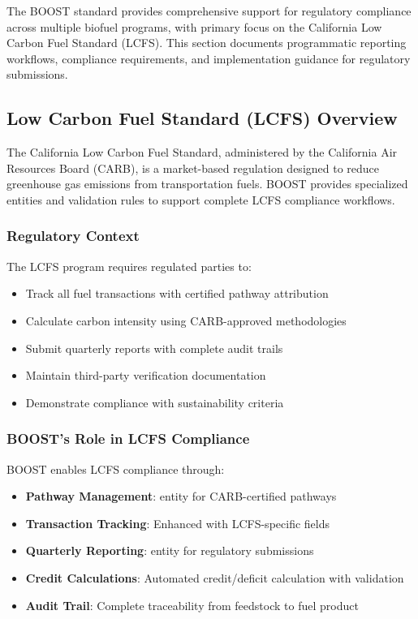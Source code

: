 

The BOOST standard provides comprehensive support for regulatory compliance across multiple biofuel programs, with primary focus on the California Low Carbon Fuel Standard (LCFS). This section documents programmatic reporting workflows, compliance requirements, and implementation guidance for regulatory submissions.

\subsection{Low Carbon Fuel Standard (LCFS) Overview}
\label{sec:lcfs-overview}

The California Low Carbon Fuel Standard, administered by the California Air Resources Board (CARB), is a market-based regulation designed to reduce greenhouse gas emissions from transportation fuels. BOOST provides specialized entities and validation rules to support complete LCFS compliance workflows.

\subsubsection{Regulatory Context}

The LCFS program requires regulated parties to:
\begin{itemize}
    \item Track all fuel transactions with certified pathway attribution
    \item Calculate carbon intensity using CARB-approved methodologies
    \item Submit quarterly reports with complete audit trails
    \item Maintain third-party verification documentation
    \item Demonstrate compliance with sustainability criteria
\end{itemize}

\subsubsection{BOOST's Role in LCFS Compliance}

BOOST enables LCFS compliance through:
\begin{itemize}
    \item \textbf{Pathway Management}:  entity for CARB-certified pathways
    \item \textbf{Transaction Tracking}: Enhanced  with LCFS-specific fields
    \item \textbf{Quarterly Reporting}:  entity for regulatory submissions
    \item \textbf{Credit Calculations}: Automated credit/deficit calculation with validation
    \item \textbf{Audit Trail}: Complete traceability from feedstock to fuel product
\end{itemize}

